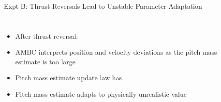 \begin{frame}{Expt B: Thrust Reversals Lead to Unstable Parameter Adaptation}
\begin{columns}
    
      \begin{itemize}
      \item<2-> After \alert<2-3>{thrust reversal}: 
    \item<4-> AMBC interprets position and velocity deviations as the
      pitch mass estimate is too large
    \item<5->Pitch mass estimate update law has 
       \item<6->Pitch mass estimate adapts to physically unrealistic value
      \end{itemize} 
    
      \begin{center}
      \end{center}    
      
  \end{columns} 


\end{frame}


